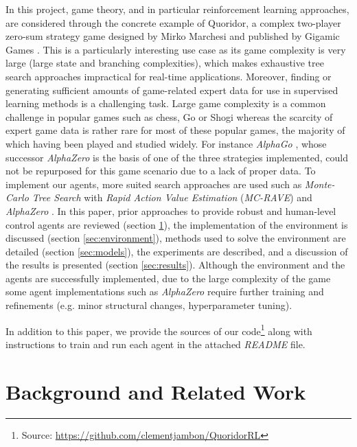\documentclass[journal, a4paper]{IEEEtran}
\begin{document}
In this project, game theory, and in particular reinforcement learning approaches, are considered through the concrete example of Quoridor, a complex two-player zero-sum strategy game designed by Mirko Marchesi and published by Gigamic Games \cite{quoridor-gigamic}. This is a particularly interesting use case as its game complexity is very large (large state and branching complexities), which makes exhaustive tree search approaches impractical for real-time applications. Moreover, finding or generating sufficient amounts of game-related expert data for use in supervised learning methods is a challenging task. Large game complexity is a common challenge in popular games such as chess, Go or Shogi whereas the scarcity of expert game data is rather rare for most of these popular games, the majority of which having been played and studied widely. For instance \textit{AlphaGo} \cite{alphago}, whose successor \textit{AlphaZero} \cite{alphazero} is the basis of one of the three strategies implemented, could not be repurposed for this game scenario due to a lack of proper data. To implement our agents, more suited search approaches are used such as \textit{Monte-Carlo Tree Search} with \textit{Rapid Action Value Estimation} (\textit{MC-RAVE}) \cite{GELLY20111856} and \textit{AlphaZero} \cite{alphazero}. In this paper, prior approaches to provide robust and human-level control agents are reviewed (section \ref{sec:background}), the implementation of the environment is discussed (section \ref{sec:environment}), methods used to solve the environment are detailed (section \ref{sec:models}), the experiments are described, and a discussion of the results is presented (section \ref{sec:results}).
 Although the environment and the agents are successfully implemented, due to the large complexity of the game some agent implementations such as \textit{AlphaZero} require further training and refinements (e.g. minor structural changes, hyperparameter tuning). 

In addition to this paper, we provide the sources of our code\footnote{Source: \url{https://github.com/clementjambon/QuoridorRL}} along with instructions to train and run each agent in the attached \textit{README} file. 

\section{Background and Related Work}
\label{sec:background}
\end{document}
